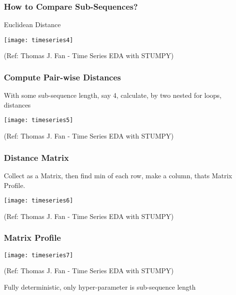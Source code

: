 \begin{frame}[fragile]\frametitle{How to Compare Sub-Sequences?}

Euclidean Distance

      \begin{center}
        \texttt{[image: timeseries4]}

		{\tiny (Ref: Thomas J. Fan - Time Series EDA with STUMPY)}		
        \end{center}
	

\end{frame}

\begin{frame}[fragile]\frametitle{Compute Pair-wise Distances}

With some sub-sequence length, say 4, calculate, by two nested for loops, distances

      \begin{center}
        \texttt{[image: timeseries5]}

		{\tiny (Ref: Thomas J. Fan - Time Series EDA with STUMPY)}		
        \end{center}
	

\end{frame}


\begin{frame}[fragile]\frametitle{Distance Matrix}

Collect as a Matrix, then find min of each row, make a column, thats Matrix Profile.
      \begin{center}
        \texttt{[image: timeseries6]}

		{\tiny (Ref: Thomas J. Fan - Time Series EDA with STUMPY)}		
        \end{center}
	

\end{frame}

\begin{frame}[fragile]\frametitle{Matrix Profile}

      \begin{center}

        \texttt{[image: timeseries7]}

		{\tiny (Ref: Thomas J. Fan - Time Series EDA with STUMPY)}		
        \end{center}
	
Fully deterministic, only hyper-parameter is sub-sequence length
\end{frame}

